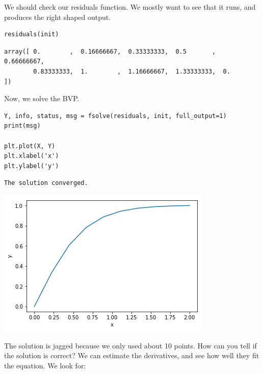 \documentclass[11pt]{article}
\begin{document}
We should check our residuals function. We mostly want to see that it runs, and produces the right shaped output.

\begin{verbatim}
residuals(init)
\end{verbatim}

\begin{verbatim}
array([ 0.        ,  0.16666667,  0.33333333,  0.5       ,  0.66666667,
        0.83333333,  1.        ,  1.16666667,  1.33333333,  0.        ])
\end{verbatim}

Now, we solve the BVP.

\begin{verbatim}
Y, info, status, msg = fsolve(residuals, init, full_output=1)
print(msg)

plt.plot(X, Y)
plt.xlabel('x')
plt.ylabel('y')
\end{verbatim}

\begin{verbatim}
The solution converged.

\end{verbatim}




\begin{center}
\includegraphics[width=.9\linewidth]{obipy-resources/9f7f3151fe203e2a10edce4b06f0b33f-90490c6g.png}
\end{center}

The solution is jagged because we only used about 10 points. How can you tell if the solution is correct? We can estimate the derivatives, and see how well they fit the equation. We look for:
\end{document}
